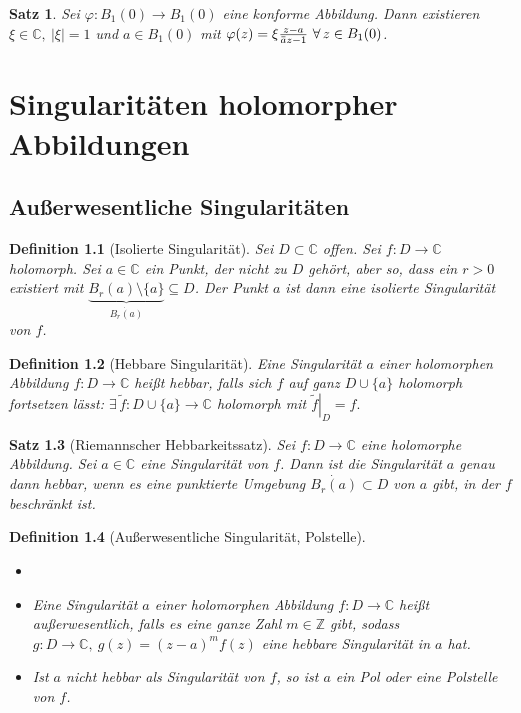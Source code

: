 \documentclass[a4paper,12pt]{book}
\theoremstyle{newthm}
\newtheorem{thm}{Satz}[section]
\theoremstyle{newdef}
\newtheorem{defn}[thm]{Definition}
\theoremstyle{newrem}
\newcommand{\Z}{\mathbb{Z}}
\newcommand{\C}{\mathbb{C}}
\newcommand{\bound}[2]{\left.#1\right|_{#2}}
\newcommand{\overbar}[1]{\mkern 1.5mu\overline{\mkern-1.5mu#1\mkern-1.5mu}\mkern 1.5mu}
\begin{document}
		\begin{thm}
			Sei $ \varphi: B_1(0) \to B_1(0) $ eine konforme Abbildung. Dann existieren $ \xi \in \C,\ |\xi| = 1 $ und $ a \in B_1(0) $ mit $ \varphi(z) = \xi \frac{z-a}{\overbar{a}z-1}\ \forall\, z \in B_1(0) $.
		\end{thm}
		



\chapter{Singularitäten holomorpher Abbildungen}
	
	\section{Außerwesentliche Singularitäten}
		
		\begin{defn}[Isolierte Singularität]
			Sei $ D \subset \C $ offen. Sei $ f: D \to \C $ holomorph. Sei $ a \in \C $ ein Punkt, der nicht zu $D$ gehört, aber so, dass ein $r>0$ existiert mit $ \underbrace{B_r(a) \setminus \{a\}}_{\dot{B_r(a)}} \subseteq D $. Der Punkt $a$ ist dann eine \emph{isolierte Singularität} von $f$.
		\end{defn}
		
		\begin{defn}[Hebbare Singularität]
			Eine Singularität $a$ einer holomorphen Abbildung $f: D \to \C$ heißt \emph{hebbar}, falls sich $f$ auf ganz $D \cup \{a\}$ holomorph fortsetzen lässt: $ \exists\, \tilde{f}: D \cup \{a\} \to \C $ holomorph mit $ \bound{\tilde{f}}{D} = f. $
		\end{defn}
		
		\begin{thm}[Riemannscher Hebbarkeitssatz]
			Sei $ f: D \to \C $ eine holomorphe Abbildung. Sei $a \in \C$ eine Singularität von $f$. Dann ist die Singularität $a$ genau dann hebbar, wenn es eine punktierte Umgebung $ \dot{B_r(a)} \subset D $ von $a$ gibt, in der $f$ beschränkt ist.
		\end{thm}
		
		\begin{defn}[Außerwesentliche Singularität, Polstelle]
			\begin{itemize}
				\item[]
				\item Eine Singularität $a$ einer holomorphen Abbildung $ f: D \to \C $ heißt \emph{außerwesentlich}, falls es eine ganze Zahl $m \in \Z$ gibt, sodass $ g: D \to \C,\ g(z) = (z-a)^mf(z) $ eine hebbare Singularität in $a$ hat.
				\item Ist $a$ nicht hebbar als Singularität von $f$, so ist $a$ ein \emph{Pol} oder eine \emph{Polstelle} von $f$.
			\end{itemize}
		\end{defn}
		
\end{document}
